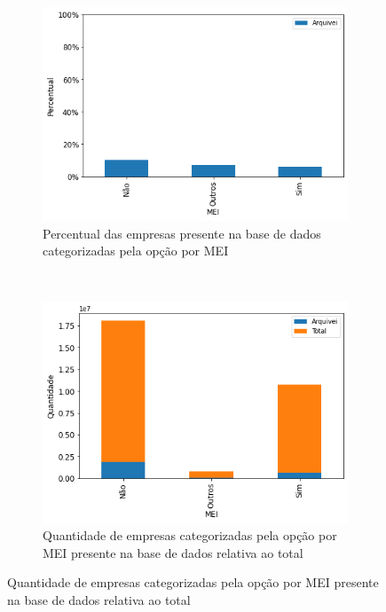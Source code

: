 \begin{figure}[htb]
    \centering
    \caption{Participação por opção pelo MEI das empresas presentes na base de dados}
    \label{fig:base-de-dados:descritiva-5-qtde-por-mei}
    \begin{subfigure}[b]{0.45\textwidth} 
        \includegraphics[scale=0.45]{images/base-de-dados-5.1-presenca-por-mei.png}
        \caption{Percentual das empresas presente na base de dados categorizadas pela opção por MEI}
        \label{fig:base-de-dados:descritiva-5.1-presenca-por-mei}
    \end{subfigure} ~ \quad
    \begin{subfigure}[b]{0.45\textwidth}
        \includegraphics[scale=0.45]{images/base-de-dados-5.2-qtde-por-mei.png}
        \caption{Quantidade de empresas categorizadas pela opção por MEI presente na base de dados relativa ao total}
        \label{fig:base-de-dados:descritiva-5.2-qtde-por-mei}
    \end{subfigure}
    \fdadospesquisa
\end{figure}

